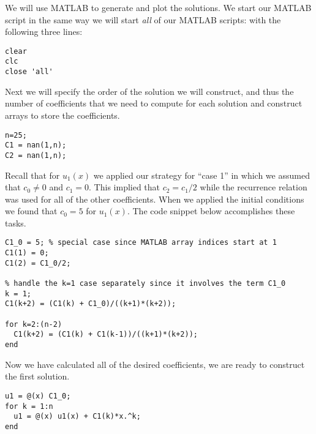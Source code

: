 We will use MATLAB to generate and plot the solutions.  We start our MATLAB script in the same way we will start \emph{all} of our MATLAB scripts: with the following three lines:
\begin{lstlisting}[name=lec9_ex1]
clear
clc
close 'all'
\end{lstlisting}
Next we will specify the order of the solution we will construct, and thus the number of coefficients that we need to compute for each solution and construct arrays to store the coefficients.
\begin{lstlisting}[name=lec9_ex1]
n=25;
C1 = nan(1,n);
C2 = nan(1,n);
\end{lstlisting}
Recall that for $u_1(x)$ we applied our strategy for ``case 1'' in which we assumed that $c_0 \ne 0$ and $c_1 = 0$.  This implied that $c_2 = c_1/2$ while the recurrence relation was used for all of the other coefficients.  When we applied the initial conditions we found that $c_0=5$ for $u_1(x)$.  The code snippet below accomplishes these tasks.
\begin{lstlisting}[name=lec9_ex1]
C1_0 = 5; % special case since MATLAB array indices start at 1
C1(1) = 0;
C1(2) = C1_0/2;

% handle the k=1 case separately since it involves the term C1_0
k = 1;
C1(k+2) = (C1(k) + C1_0)/((k+1)*(k+2));

for k=2:(n-2)
  C1(k+2) = (C1(k) + C1(k-1))/((k+1)*(k+2));
end
\end{lstlisting} 
Now we have calculated all of the desired coefficients, we are ready to construct the first solution.
\begin{lstlisting}[name=lec9_ex1]
u1 = @(x) C1_0;
for k = 1:n
  u1 = @(x) u1(x) + C1(k)*x.^k;
end
\end{lstlisting}
